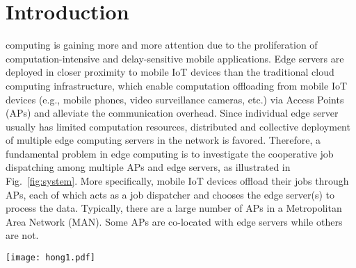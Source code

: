 \section{Introduction}
\label{sec:introduction}
 computing is gaining more and more attention due to the proliferation of computation-intensive and delay-sensitive mobile applications.
Edge servers are deployed in closer proximity to mobile IoT devices than the traditional cloud computing infrastructure, which enable computation offloading from mobile IoT devices (e.g., mobile phones, video surveillance cameras, etc.) via Access Points (APs) and alleviate the communication overhead. 
Since individual edge server usually has limited computation resources, distributed and collective deployment of multiple edge computing servers in the network is favored.
Therefore, a fundamental problem in edge computing is to investigate the cooperative job dispatching among multiple APs and edge servers, as illustrated in Fig.~\ref{fig:system}.
More specifically, mobile IoT devices offload their jobs through APs, each of which acts as a job dispatcher and chooses the edge server(s) to process the data. Typically, there are a large number of APs in a Metropolitan Area Network (MAN). Some APs are co-located with edge servers while others are not.

\begin{figure*}[htp!]
    \centering
    \texttt{[image: hong1.pdf]}
    \caption{An illustration of the system model.}
    \label{fig:system}
\end{figure*}

